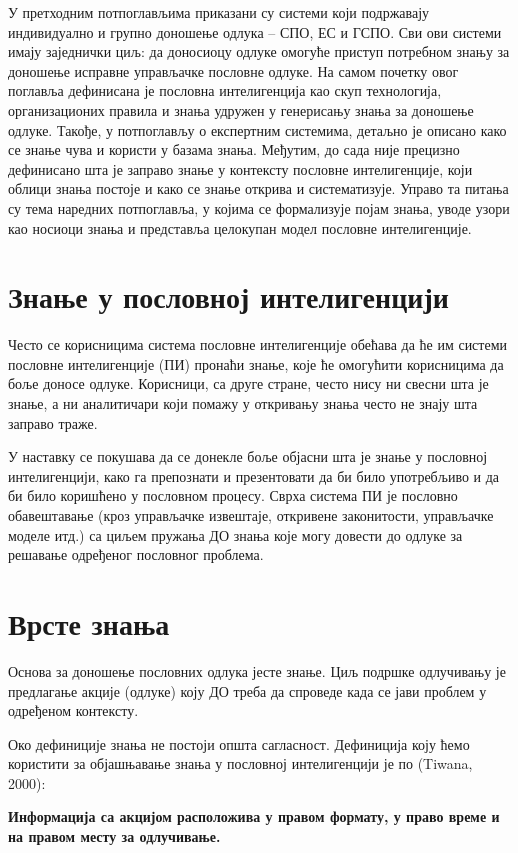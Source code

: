 У претходним потпоглављима приказани су системи који подржавају индивидуално и групно доношење одлука – СПО, ЕС и ГСПО. Сви ови системи имају заједнички циљ: да доносиоцу одлуке омогуће приступ потребном знању за доношење исправне управљачке пословне одлуке. На самом почетку овог поглавља дефинисана је пословна интелигенција као скуп технологија, организационих правила и знања удружен у генерисању знања за доношење одлуке. Такође, у потпоглављу о експертним системима, детаљно је описано како се знање чува и користи у базама знања. Међутим, до сада није прецизно дефинисано шта је заправо знање у контексту пословне интелигенције, који облици знања постоје и како се знање открива и систематизује. Управо та питања су тема наредних потпоглавља, у којима се формализује појам знања, уводе узори као носиоци знања и представља целокупан модел пословне интелигенције.

\section{Знање у пословној интелигенцији}
Често се корисницима система пословне интелигенције обећава да ће им системи пословне интелигенције (ПИ) пронаћи знање, које ће омогућити корисницима да боље доносе одлуке. Корисници, са друге стране, често нису ни свесни шта је знање, а ни аналитичари који помажу у откривању знања често не знају шта заправо траже.

У наставку се покушава да се донекле боље објасни шта је знање у пословној интелигенцији, како га препознати и презентовати да би било употребљиво и да би било коришћено у пословном процесу. Сврха система ПИ је пословно обавештавање (кроз управљачке извештаје, откривене законитости, управљачке моделе итд.) са циљем пружања ДО знања које могу довести до одлуке за решавање одређеног пословног проблема.

\section{Врсте знања}
Основа за доношење пословних одлука јесте знање. Циљ подршке одлучивању је предлагање акције (одлуке) коју ДО треба да спроведе када се јави проблем у одређеном контексту.

Око дефиниције знања не постоји општа сагласност. Дефиниција коју ћемо користити за објашњавање знања у пословној интелигенцији је по (Tiwana, 2000):

\textbf{Информација са акцијом расположива у правом формату, у право време и на правом месту за одлучивање.}

